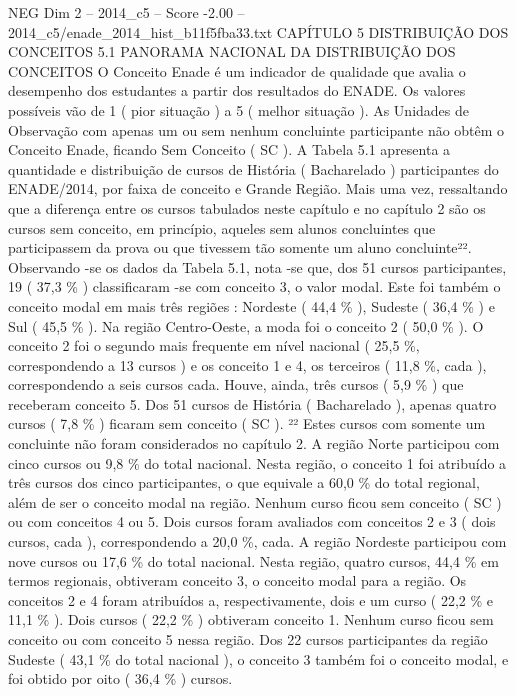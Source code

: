 \begin{textsample}{NEG Dim 2 – 2014\_c5 – Score -2.00 – 2014\_c5/enade\_2014\_hist\_b11f5fba33.txt}  \label{ex:f2_neg_126}
CAPÍTULO 5 DISTRIBUIÇÃO DOS CONCEITOS 5.1 PANORAMA NACIONAL DA DISTRIBUIÇÃO DOS CONCEITOS O Conceito Enade é um indicador de qualidade que avalia o desempenho dos estudantes a partir dos resultados do ENADE.
Os valores possíveis vão de 1 ( pior situação ) a 5 ( melhor situação ).
As Unidades de Observação com apenas um ou sem nenhum concluinte participante não obtêm o Conceito Enade, ficando Sem Conceito ( SC ).
A Tabela 5.1 apresenta a quantidade e distribuição de cursos de História ( Bacharelado ) participantes do ENADE/2014, por faixa de conceito e Grande Região.
Mais uma vez, ressaltando que a diferença entre os cursos tabulados neste capítulo e no capítulo 2 são os cursos sem conceito, em princípio, aqueles sem alunos concluintes que participassem da prova ou que tivessem tão somente um aluno concluinte²².
Observando -se os dados da Tabela 5.1, nota -se que, dos 51 cursos participantes, 19 ( 37,3 \% ) classificaram -se com conceito 3, o valor modal.
Este foi também o conceito modal em mais três regiões : Nordeste ( 44,4 \% ), Sudeste ( 36,4 \% ) e Sul ( 45,5 \% ).
Na região Centro-Oeste, a moda foi o conceito 2 ( 50,0 \% ).
O conceito 2 foi o segundo mais frequente em nível nacional ( 25,5 \%, correspondendo a 13 cursos ) e os conceito 1 e 4, os terceiros ( 11,8 \%, cada ), correspondendo a seis cursos cada.
Houve, ainda, três cursos ( 5,9 \% ) que receberam conceito 5.
Dos 51 cursos de História ( Bacharelado ), apenas quatro cursos ( 7,8 \% ) ficaram sem conceito ( SC ). ²² Estes cursos com somente um concluinte não foram considerados no capítulo 2.
A região Norte participou com cinco cursos ou 9,8 \% do total nacional.
Nesta região, o conceito 1 foi atribuído a três cursos dos cinco participantes, o que equivale a 60,0 \% do total regional, além de ser o conceito modal na região.
Nenhum curso ficou sem conceito ( SC ) ou com conceitos 4 ou 5.
Dois cursos foram avaliados com conceitos 2 e 3 ( dois cursos, cada ), correspondendo a 20,0 \%, cada.
A região Nordeste participou com nove cursos ou 17,6 \% do total nacional.
Nesta região, quatro cursos, 44,4 \% em termos regionais, obtiveram conceito 3, o conceito modal para a região.
Os conceitos 2 e 4 foram atribuídos a, respectivamente, dois e um curso ( 22,2 \% e 11,1 \% ).
Dois cursos ( 22,2 \% ) obtiveram conceito 1.
Nenhum curso ficou sem conceito ou com conceito 5 nessa região.
Dos 22 cursos participantes da região Sudeste ( 43,1 \% do total nacional ), o conceito 3 também foi o conceito modal, e foi obtido por oito ( 36,4 \% ) cursos.

\end{textsample}
